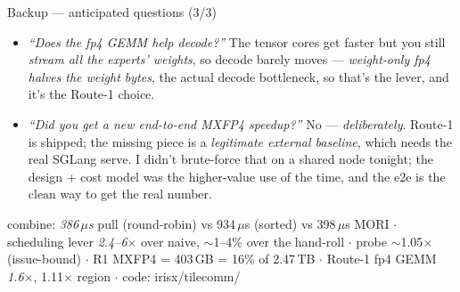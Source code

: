 \documentclass[pdf,aspectratio=169]{beamer}
\newcommand{\empy}[1]{{\color{darkorange}\emph{#1}}}
\newcommand{\empr}[1]{{\color{cardinalred}\emph{#1}}}
\newcommand{\examplebox}[2]{%
\begin{tcolorbox}[colframe=darkcardinal,colback=boxgray,title={#1}]
#2
\end{tcolorbox}}
\newcommand{\mc}[1]{{\ttfamily\small #1}}
\begin{document}
\begin{frame}{Backup --- anticipated questions (3/3)}
\footnotesize
\begin{itemize}\footnotesize
  \item \empr{``Does the fp4 GEMM help decode?''} The tensor cores get faster but you still \emph{stream all the experts' weights}, so decode barely moves --- \empy{weight-only fp4 halves the weight bytes}, the actual decode bottleneck, so that's the lever, and it's the Route-1 choice.
  \item \empr{``Did you get a new end-to-end MXFP4 speedup?''} No --- \emph{deliberately}. Route-1 is shipped; the missing piece is a \empy{legitimate external baseline}, which needs the real SGLang serve. I didn't brute-force that on a shared node tonight; the design + cost model was the higher-value use of the time, and the e2e is the clean way to get the real number.
\end{itemize}
\vspace{0.5ex}
\examplebox{Numbers at a glance}{\scriptsize
combine: \empy{386\,$\mu$s} pull (round-robin) vs 934\,$\mu$s (sorted) vs 398\,$\mu$s MORI \;$\cdot$\; scheduling lever \empy{2.4--6$\times$} over naive, $\sim$1--4\% over the hand-roll \;$\cdot$\; probe $\sim$1.05$\times$ (issue-bound) \;$\cdot$\; R1 MXFP4 = 403\,GB = 16\% of 2.47\,TB \;$\cdot$\; Route-1 fp4 GEMM \empy{1.6$\times$}, 1.11$\times$ region \;$\cdot$\; code: \mc{irisx/tilecomm/}}
\end{frame}
\end{document}
